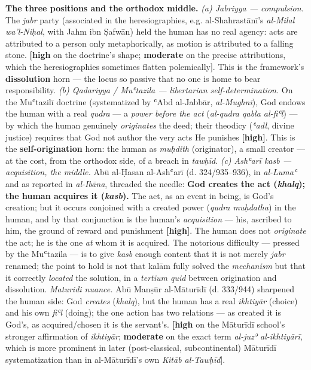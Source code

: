 \documentclass[11pt]{article}
\begin{document}
\textbf{The three positions and the orthodox middle.} \emph{(a) Jabriyya — compulsion.} The \emph{jabr} party (associated in the heresiographies, e.g. al-Shahrastānī's \emph{al-Milal wa'l-Niḥal}, with Jahm ibn Ṣafwān) held the human has no real agency: acts are attributed to a person only metaphorically, as motion is attributed to a falling stone. \textbf{[high} on the doctrine's shape; \textbf{moderate} on the precise attributions, which the heresiographies sometimes flatten polemically]. This is the framework's \textbf{dissolution} horn — the locus so passive that no one is home to bear responsibility. \emph{(b) Qadariyya /\allowbreak{} Muʿtazila — libertarian self-determination.} On the Muʿtazilī doctrine (systematized by ʿAbd al-Jabbār, \emph{al-Mughnī}), God endows the human with a real \emph{qudra} — a \emph{power before the act} (\emph{al-qudra qabla al-fiʿl}) — by which the human genuinely \emph{originates} the deed; their theodicy (\emph{ʿadl}, divine justice) requires that God not author the very acts He punishes \textbf{[high]}. This is the \textbf{self-origination} horn: the human as \emph{muḥdith} (originator), a small creator — at the cost, from the orthodox side, of a breach in \emph{tawḥīd}. \emph{(c) Ashʿarī kasb — acquisition, the middle.} Abū al-Ḥasan al-Ashʿarī (d. 324/\allowbreak{}935–936), in \emph{al-Lumaʿ} and as reported in \emph{al-Ibāna}, threaded the needle: \textbf{God creates the act (\emph{khalq}); the human acquires it (\emph{kasb}).} The act, as an event in being, is God's creation; but it occurs conjoined with a created power (\emph{qudra muḥdatha}) in the human, and by that conjunction is the human's \emph{acquisition} — his, ascribed to him, the ground of reward and punishment \textbf{[high]}. The human does not \emph{originate} the act; he is the one \emph{at} whom it is acquired. The notorious difficulty — pressed by the Muʿtazila — is to give \emph{kasb} enough content that it is not merely \emph{jabr} renamed; the point to hold is not that kalām fully solved the \emph{mechanism} but that it correctly \emph{located} the solution, in a \emph{tertium quid} between origination and dissolution. \emph{Maturidi nuance.} Abū Manṣūr al-Māturīdī (d. 333/\allowbreak{}944) sharpened the human side: God \emph{creates} (\emph{khalq}), but the human has a real \emph{ikhtiyār} (choice) and his own \emph{fiʿl} (doing); the one action has two relations — as created it is God's, as acquired/\allowbreak{}chosen it is the servant's. \textbf{[high} on the Māturīdī school's stronger affirmation of \emph{ikhtiyār}; \textbf{moderate} on the exact term \emph{al-juzʾ al-ikhtiyārī}, which is more prominent in later (post-classical, subcontinental) Māturīdī systematization than in al-Māturīdī's own \emph{Kitāb al-Tawḥīd}].
\end{document}
